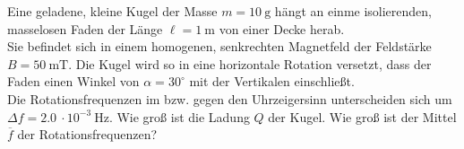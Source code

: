 \begin{Exercise}[label = magneticpendulum, origin = {3. Runde zur 42. IPhO 2011}, title = Geladene Kugel am Faden, difficulty = 2]
	Eine geladene, kleine Kugel der Masse $m = 10~\mathrm{g}$ hängt an einme isolierenden, masselosen Faden der Länge $\ell = 1~\mathrm{m}$ von einer Decke herab.\\
	Sie befindet sich in einem homogenen, senkrechten Magnetfeld der Feldstärke $B = 50~\mathrm{mT}$. Die Kugel wird so in eine horizontale Rotation versetzt, dass der Faden einen Winkel von $\alpha = 30^\circ$ mit der Vertikalen einschließt.\\
	Die Rotationsfrequenzen im bzw. gegen den Uhrzeigersinn unterscheiden sich um $\Delta f = 2.0~\cdot 10^{-3}~\mathrm{Hz}$.
	\Question Wie groß ist die Ladung $Q$ der Kugel.
	\Question Wie groß ist der Mittel $\overline{f}$ der Rotationsfrequenzen?
\end{Exercise}